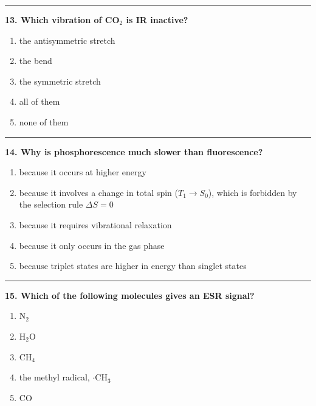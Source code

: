 \documentclass[
  english,
  9pt,
]{extbook}
\newcounter{none} %
\providecommand{\tightlist}{%
  \setlength{\itemsep}{0pt}\setlength{\parskip}{0pt}}
\theoremstyle{definition}
\theoremstyle{definition}
\theoremstyle{definition}
\theoremstyle{definition}
\theoremstyle{remark}
\begin{document}
\begin{center}\rule{0.5\linewidth}{0.5pt}\end{center}

\textbf{13. Which vibration of CO\(_2\) is IR inactive?}

\begin{enumerate}
\def\labelenumi{\alph{enumi}.}
\tightlist
\item
  the antisymmetric stretch\\
\item
  the bend\\
\item
  the symmetric stretch\\
\item
  all of them\\
\item
  none of them
\end{enumerate}

\begin{center}\rule{0.5\linewidth}{0.5pt}\end{center}

\textbf{14. Why is phosphorescence much slower than fluorescence?}

\begin{enumerate}
\def\labelenumi{\alph{enumi}.}
\tightlist
\item
  because it occurs at higher energy\\
\item
  because it involves a change in total spin (\(T_1\rightarrow S_0\)), which is forbidden by the selection rule \(\Delta S=0\)\\
\item
  because it requires vibrational relaxation\\
\item
  because it only occurs in the gas phase\\
\item
  because triplet states are higher in energy than singlet states
\end{enumerate}

\begin{center}\rule{0.5\linewidth}{0.5pt}\end{center}

\textbf{15. Which of the following molecules gives an ESR signal?}

\begin{enumerate}
\def\labelenumi{\alph{enumi}.}
\tightlist
\item
  N\(_2\)\\
\item
  H\(_2\)O\\
\item
  CH\(_4\)\\
\item
  the methyl radical, \(\cdot\)CH\(_3\)\\
\item
  CO
\end{enumerate}
\end{document}
